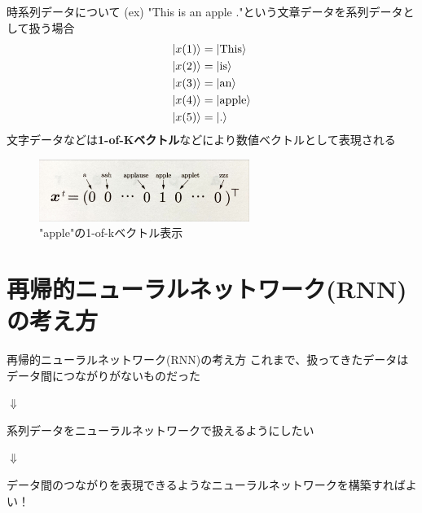 \documentclass[dvipdfmx,10pt]{beamer}
\begin{document}
  \begin{frame}{時系列データについて}
    (ex) "This is an apple ."という文章データを系列データとして扱う場合
    \begin{align*}
      \ket{x(1)} &= \ket{\text{This}}\\
      \ket{x(2)} &= \ket{\text{is}}\\
      \ket{x(3)} &= \ket{\text{an}}\\
      \ket{x(4)} &= \ket{\text{apple}}\\
      \ket{x(5)} &= \ket{\text{.}}
    \end{align*}
    文字データなどは\textbf{1-of-Kベクトル}などにより数値ベクトルとして表現される
    \begin{figure}
      \begin{center}
        \includegraphics[height=2cm]{image/apple_vector.jpeg}
      \end{center} 
      \caption{"apple"の1-of-kベクトル表示}  
    \end{figure}
  \end{frame}

  \section{再帰的ニューラルネットワーク(RNN)の考え方}
  \begin{frame}{再帰的ニューラルネットワーク(RNN)の考え方}
    これまで、扱ってきたデータはデータ間につながりがないものだった
    \begin{center}
      $\Downarrow$
    \end{center}
    系列データをニューラルネットワークで扱えるようにしたい\\
    \begin{center}
      $\Downarrow$
    \end{center}
    データ間のつながりを表現できるようなニューラルネットワークを構築すればよい！
  \end{frame}
\end{document}
